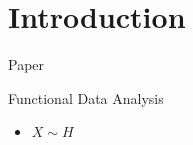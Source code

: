 \section{Introduction}


\begin{frame}{Paper}
\begin{figure}[ht]
    \centering
    \vspace{-0.8cm}
\end{figure}
\end{frame}


\begin{frame}{Functional Data Analysis}
  \Large{
  \begin{itemize}
      \item[] $X \sim H$
  \end{itemize}
  }
\end{frame}

